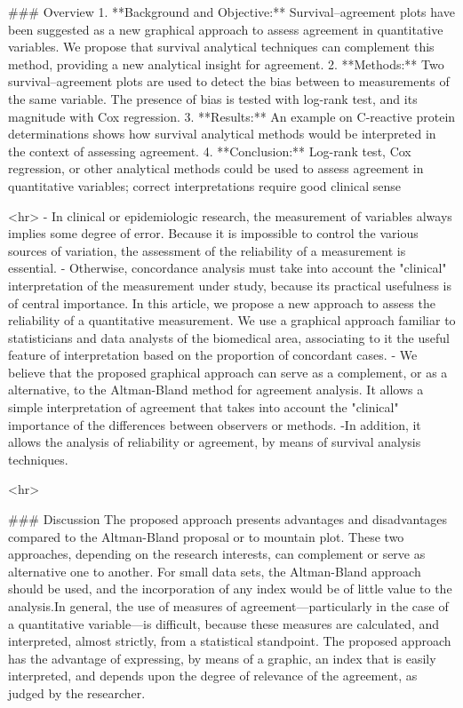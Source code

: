 ### Overview
1. **Background and Objective:** Survival–agreement plots have been suggested as a new graphical approach to assess agreement in
quantitative variables. We propose that survival analytical techniques can complement this method, providing a new analytical insight
for agreement.
2. **Methods:** Two survival–agreement plots are used to detect the bias between to measurements of the same variable. The presence of
bias is tested with log-rank test, and its magnitude with Cox regression.
3. **Results:** An example on C-reactive protein determinations shows how survival analytical methods would be interpreted in the context
of assessing agreement.
4. **Conclusion:** Log-rank test, Cox regression, or other analytical methods could be used to assess agreement in quantitative variables;
correct interpretations require good clinical sense

<hr>
- In clinical or epidemiologic research, the measurement of variables always implies some degree of error.
Because it is impossible to control the various sources of variation, the assessment of the reliability of a
measurement is essential. 
- Otherwise, concordance analysis must take into account the "clinical" interpretation 
of the measurement under study, because its practical usefulness is of central importance. In this article, 
we propose a new approach to assess the reliability of a quantitative measurement. We use a graphical approach 
familiar to statisticians and data analysts of the biomedical area, associating to it the useful feature of 
interpretation based on the proportion of concordant cases. 
- We believe that the proposed graphical approach 
can serve as a complement, or as a alternative, to the Altman-Bland method for agreement analysis. It allows
a simple interpretation of agreement that takes into account the "clinical" importance of the differences 
between observers or methods. 
-In addition, it allows the analysis of reliability or agreement, by means of survival analysis techniques.

<hr>

### Discussion
The proposed approach presents advantages and disadvantages compared to the Altman-Bland proposal or to
mountain plot. These two approaches, depending on the research interests, can complement or serve as alternative
one to another. For small data sets, the Altman-Bland approach should be used, and the incorporation of any index
would be of little value to the analysis.In general, the use of measures of agreement—particularly
in the case of a quantitative variable—is difficult, because these measures are calculated, and interpreted, almost
strictly, from a statistical standpoint. The proposed approach has the advantage of expressing, by means of a graphic, an
index that is easily interpreted, and depends upon the degree of relevance of the agreement, as judged by the researcher.

